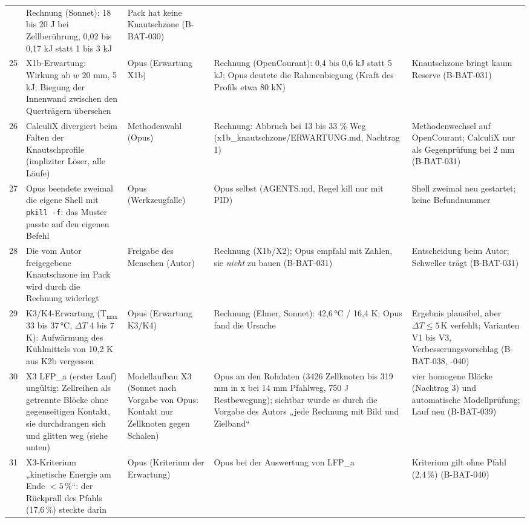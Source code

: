 \documentclass[10pt,a4paper]{article}
\begin{document}
\begin{longtable}{@{}p{0.4cm}p{3.6cm}p{2.5cm}p{4.4cm}p{3.0cm}@{}}
 & Rechnung (Sonnet): 18 bis 20 J bei Zellberührung, 0,02 bis 0,17 kJ statt 1 bis 3 kJ & Pack hat keine Knautschzone (B-BAT-030)\\
25 & X1b-Erwartung: Wirkung ab $w$ 20 mm, 5 kJ; Biegung der Innenwand zwischen den Querträgern übersehen & Opus (Erwartung X1b)
 & Rechnung (OpenCourant): 0,4 bis 0,6 kJ statt 5 kJ; Opus deutete die Rahmenbiegung (Kraft des Profils etwa 80 kN) & Knautschzone bringt kaum Reserve (B-BAT-031)\\
26 & CalculiX divergiert beim Falten der Knautschprofile (impliziter Löser, alle Läufe) & Methodenwahl (Opus)
 & Rechnung: Abbruch bei 13 bis 33 \% Weg (x1b\_knautschzone/ERWARTUNG.md, Nachtrag 1) & Methodenwechsel auf OpenCourant; CalculiX nur als Gegenprüfung bei 2 mm (B-BAT-031)\\
27 & Opus beendete zweimal die eigene Shell mit \texttt{pkill -f}: das Muster passte auf den eigenen Befehl & Opus (Werkzeugfalle)
 & Opus selbst (AGENTS.md, Regel kill nur mit PID) & Shell zweimal neu gestartet; keine Befundnummer\\
28 & Die vom Autor freigegebene Knautschzone im Pack wird durch die Rechnung widerlegt & Freigabe des Menschen (Autor)
 & Rechnung (X1b/X2); Opus empfahl mit Zahlen, sie \emph{nicht} zu bauen (B-BAT-031) & Entscheidung beim Autor; Schweller trägt (B-BAT-031)\\
29 & K3/K4-Erwartung (T$_{\max}$ 33 bis 37\,°C, $\Delta T$ 4 bis 7 K): Aufwärmung des Kühlmittels von 10,2 K aus K2b vergessen & Opus (Erwartung K3/K4)
 & Rechnung (Elmer, Sonnet): 42,6\,°C / 16,4 K; Opus fand die Ursache & Ergebnis plausibel, aber $\Delta T\le5$\,K verfehlt; Varianten V1 bis V3, Verbesserungsvorschlag (B-BAT-038, -040)\\
30 & X3 LFP\_a (erster Lauf) ungültig: Zellreihen als getrennte Blöcke ohne gegenseitigen Kontakt, sie durchdrangen sich und glitten weg (siehe unten) & Modellaufbau X3 (Sonnet nach Vorgabe von Opus: Kontakt nur Zellknoten gegen Schalen)
 & Opus an den Rohdaten (3426 Zellknoten bis 319 mm in x bei 14 mm Pfahlweg, 750 J Restbewegung); sichtbar wurde es durch die Vorgabe des Autors „jede Rechnung mit Bild und Zielband“ & vier homogene Blöcke (Nachtrag 3) und automatische Modellprüfung; Lauf neu (B-BAT-039)\\
31 & X3-Kriterium „kinetische Energie am Ende $<5$\,\%“: der Rückprall des Pfahls (17,6\,\%) steckte darin & Opus (Kriterium der Erwartung)
 & Opus bei der Auswertung von LFP\_a & Kriterium gilt ohne Pfahl (2,4\,\%) (B-BAT-040)\\

\end{longtable}
\end{document}
